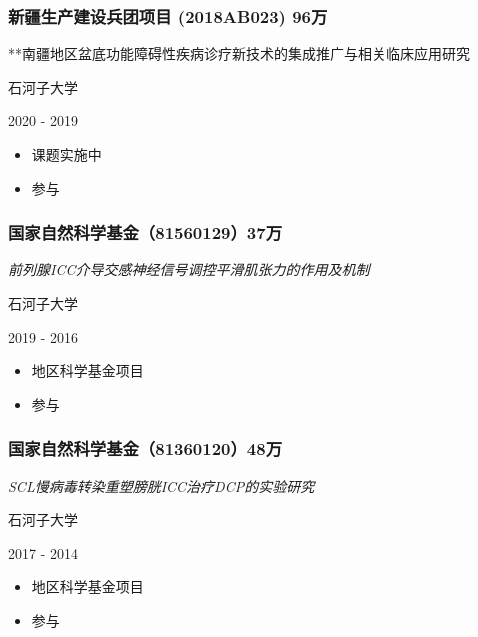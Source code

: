 \documentclass[]{article}
\providecommand{\tightlist}{%
  \setlength{\itemsep}{0pt}\setlength{\parskip}{0pt}}
\begin{document}
\hypertarget{ux65b0ux7586ux751fux4ea7ux5efaux8bbeux5175ux56e2ux9879ux76ee-2018ab023-96ux4e07}{%
\subsubsection{新疆生产建设兵团项目 (2018AB023)
96万}\label{ux65b0ux7586ux751fux4ea7ux5efaux8bbeux5175ux56e2ux9879ux76ee-2018ab023-96ux4e07}}

**南疆地区盆底功能障碍性疾病诊疗新技术的集成推广与相关临床应用研究

石河子大学

2020 - 2019

\begin{itemize}
\tightlist
\item
  课题实施中
\item
  参与
\end{itemize}

\hypertarget{ux56fdux5bb6ux81eaux7136ux79d1ux5b66ux57faux91d18156012937ux4e07}{%
\subsubsection{国家自然科学基金（81560129）37万}\label{ux56fdux5bb6ux81eaux7136ux79d1ux5b66ux57faux91d18156012937ux4e07}}

\emph{前列腺ICC介导交感神经信号调控平滑肌张力的作用及机制}

石河子大学

2019 - 2016

\begin{itemize}
\tightlist
\item
  地区科学基金项目
\item
  参与
\end{itemize}

\hypertarget{ux56fdux5bb6ux81eaux7136ux79d1ux5b66ux57faux91d18136012048ux4e07}{%
\subsubsection{国家自然科学基金（81360120）48万}\label{ux56fdux5bb6ux81eaux7136ux79d1ux5b66ux57faux91d18136012048ux4e07}}

\emph{SCL慢病毒转染重塑膀胱ICC治疗DCP的实验研究}

石河子大学

2017 - 2014

\begin{itemize}
\tightlist
\item
  地区科学基金项目
\item
  参与
\end{itemize}
\end{document}
